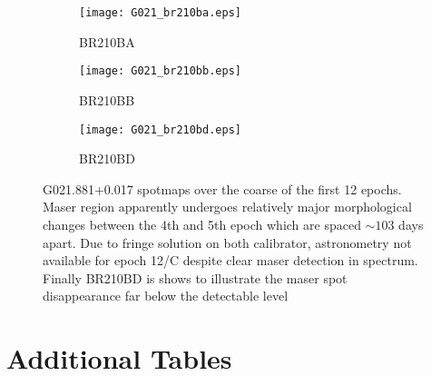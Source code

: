 \begin{figure}[h]
\begin{subfigure}{.33\textwidth}
       				\centering
       				\texttt{[image: G021\_br210ba.eps]}
       				\caption{BR210BA}
       			\end{subfigure}%
       			\begin{subfigure}{.33\textwidth}
       				\centering
       				\texttt{[image: G021\_br210bb.eps]}
       				\caption{BR210BB}
       			\end{subfigure}            	
       			\begin{subfigure}{.33\textwidth}
       				\centering
       				\texttt{[image: G021\_br210bd.eps]}
       				\caption{BR210BD}
       			\end{subfigure}%
       			\caption[G021.88+0.01 spotmaps]{G021.881+0.017 spotmaps over the coarse of the first 12 epochs. Maser region apparently undergoes relatively major morphological changes between the 4th and 5th epoch which are spaced $\sim103$ days apart. Due to fringe solution on both calibrator, astronometry not available for epoch 12/C despite clear maser detection in spectrum. Finally BR210BD is shows to illustrate the maser spot disappearance far below the detectable level} %
       			\label{fig:fig}
       		\end{figure}
       		
       				
	\clearpage
 
 \section{Additional Tables}
